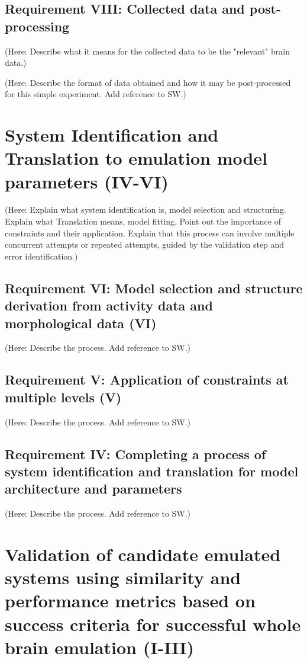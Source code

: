 \documentclass{ldr-article}
\begin{document}
\subsection{Requirement VIII: Collected data and post-processing}

(Here: Describe what it means for the collected data to be the "relevant" brain data.)

(Here: Describe the format of data obtained and how it may be post-processed for this simple experiment. Add reference to SW.)

\section{System Identification and Translation to emulation model parameters (IV-VI)}

(Here: Explain what system identification is, model selection and structuring. Explain what Translation means, model fitting. Point out the importance of constraints and their application. Explain that this process can involve multiple concurrent attempts or repeated attempts, guided by the validation step and error identification.)

\subsection{Requirement VI: Model selection and structure derivation from activity data and morphological data (VI)}

(Here: Describe the process. Add reference to SW.)

\subsection{Requirement V: Application of constraints at multiple levels (V)}

(Here: Describe the process. Add reference to SW.)

\subsection{Requirement IV: Completing a process of system identification and translation for model architecture and parameters}

(Here: Describe the process. Add reference to SW.)

\section{Validation of candidate emulated systems using similarity and performance metrics based on success criteria for successful whole brain emulation (I-III)}
\end{document}
